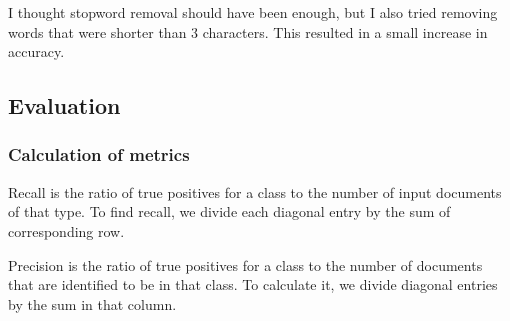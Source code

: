 I thought stopword removal should have been enough, but I also tried removing words that were shorter than 3 characters. This resulted in a small increase in accuracy.

\subsection{Evaluation}
\label{sec:bayes_evaluation}

\subsubsection{Calculation of metrics}
Recall is the ratio of true positives for a class to the number of input documents of that type. To find recall, we divide each diagonal entry by the sum of corresponding row.

Precision is the ratio of true positives for a class to the number of documents that are identified to be in that class. To calculate it, we divide diagonal entries by the sum in that column.
